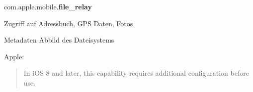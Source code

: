 \begin{frame}
	\centering
	com.apple.mobile.\textbf{file\_relay}
	\begin{block}{}
		Zugriff auf Adressbuch, GPS Daten, Fotos
	\end{block}
	\begin{block}{}
		Metadaten Abbild des Dateisystems
	\end{block}
	\begin{block}{}
		Apple:
		\begin{quote}
			In iOS 8 and later, this capability requires additional configuration before
			use.
		\end{quote}
	\end{block}
\end{frame}